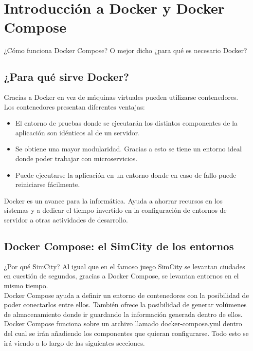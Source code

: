 \section{Introducción a Docker y Docker Compose}
¿Cómo funciona Docker Compose? O mejor dicho ¿para qué es necesario Docker?

\subsection{¿Para qué sirve Docker?}
Gracias a Docker \cite{docker-book} en vez de máquinas virtuales pueden utilizarse contenedores. Los contenedores presentan diferentes ventajas:

\begin{itemize}
    \item El entorno de pruebas donde se ejecutarán los distintos componentes de la aplicación son idénticos al de un servidor.
    \item Se obtiene una mayor modularidad. Gracias a esto se tiene un entorno ideal donde poder trabajar con microservicios.
    \item Puede ejecutarse la aplicación en un entorno donde en caso de fallo puede reiniciarse fácilmente.
\end{itemize}

Docker es un avance para la informática. Ayuda a ahorrar recursos en los sistemas y a dedicar el tiempo invertido en la configuración de entornos de servidor a otras actividades de desarrollo.

\subsection{Docker Compose: el SimCity de los entornos}

¿Por qué SimCity? Al igual que en el famoso juego SimCity se levantan ciudades en cuestión de segundos, gracias a Docker Compose, se levantan entornos en el mismo tiempo.
\\Docker Compose ayuda a definir un entorno de contenedores con la posibilidad de poder conectarlos entre ellos. También ofrece la posibilidad de generar volúmenes de almacenamiento donde ir guardando la información generada dentro de ellos.
\\Docker Compose funciona sobre un archivo llamado docker-compose.yml dentro del cual se irán añadiendo los componentes que quieran configurarse. Todo esto se irá viendo a lo largo de las siguientes secciones.